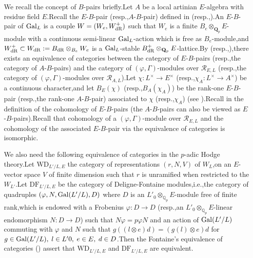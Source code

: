 \documentclass[SecEq,CM,GP]{degruyter-crelle} %
\theoremstyle{plain}
\newcommand{\dr}{{\rm dR}}
\newcommand{\gal}{{\rm Gal}}
\newcommand{\BQ}{{\mathbb{Q}}}
\newcommand{\bQ}{{\mathbf{Q}}}
\newcommand{\cR}{\mathcal R}
\begin{document}
We recall the concept of $B$-pairs briefly.\;Let $A$ be a local artinian $E$-algebra with residue field $E$.\;Recall the $E$-$B$-pair (resp.,\;$A$-$B$-pair) defined in \cite{nakamura2009classification} (resp.,\;\cite[Section 1.1]{2015Ding}).\;An $E$-$B$-pair of $\gal_L$ is a couple $W=(W_e,W^+_{\dr})$ such that $W_e$ is a  finite $B_e\otimes_{\bQ_p}E$-module  with a continuous semi-linear $\gal_L$-action which is free as $B_e$-module,\;and $W^+_{\dr}\subset W_{\dr}:=B_{\dr}\otimes_{B_e}W_e$ is a $\gal_L$-stable $B_{\dr}^+\otimes_{\bQ_p}E$-lattice.\;By \cite[Theorem 1.36]{nakamura2009classification} (resp.,\;\cite[Section 1.1]{2015Ding}),\;there exists an equivalence of categories between the category of $E$-$B$-pairs (resp.,\;the category of $A$-$B$-pairs) and  the category of $(\varphi,\Gamma)$-modules over $\cR_{E,L}$ (resp.,\;the category of $(\varphi,\Gamma)$-modules over $\cR_{A,L}$).\;Let $\chi:L^\times\rightarrow E^\times$ (resp.,\;$\chi_A:L^\times\rightarrow A^\times$) be a continuous character,\;and let $B_E(\chi)$ (resp.,\;$B_A(\chi_A)$)  be the rank-one $E$-$B$-pair (resp.,\;the rank-one $A$-$B$-pair) associated to $\chi$ (resp.,\;$\chi_A$) (see \cite[Theorem 1.45]{nakamura2009classification}).\;Recall in  \cite{nakamura2009classification} the definition of the cohomology of $E$-$B$-pairs (the $A$-$B$-pairs can also be viewed as $E$-$B$-pairs).\;Recall that cohomology of a $(\varphi,\Gamma)$-module over $\cR_{E,L}$ and the cohomology of the associated $E$-$B$-pair via the equivalence of categories \cite[Theorem 1.36]{nakamura2009classification} is isomorphic.\;

We also need the following equivalence of categories in the $p$-adic Hodge theory.\;Let  $\mathrm{WD}_{L'/L,E}$ the category of representations $(r,N,V)$ of $W_L$,\;on an $E$-vector space $V$ of finite dimension such that $r$ is unramified when restricted to the $W_{L'}$.\;Let $\mathrm{DF}_{L'/L,E}$ be the category of Deligne-Fontaine modules,\;i.e.,\;the category of quadruples $(\varphi,N,\gal(L'/L),D)$ where $D$ is an $L'_0\otimes_{\BQ_p}E$-module free of finite rank,\;which is endowed with a Frobenius $\varphi:D\rightarrow D$ (resp.,\;an $L'_0\otimes_{\BQ_p}E$-linear endomorphism $N:D\rightarrow D$) such that $N\varphi=p\varphi N$ and an action of $\gal(L'/L)$ commuting with $\varphi$ and $N$ such that $g((l\otimes e)d)=(g(l)\otimes e)d$ for $g\in \gal(L'/L),\;l\in L'0,\;e\in E,\;d\in D$.\;Then the  Fontaine's equivalence of categories (\cite[Proposition 4.1]{breuil2007first}) assert that $\mathrm{WD}_{L'/L,E}$ and $\mathrm{DF}_{L'/L,E}$ are equivalent.\;
\end{document}
